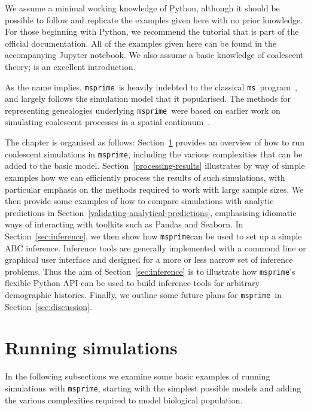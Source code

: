\documentclass[graybox]{svmult}
\newcommand{\msprime}[0]{\texttt{msprime}}
\newcommand{\ms}[0]{\texttt{ms}}
\begin{document}
We assume a minimal working knowledge of Python, although it should be 
possible to follow and replicate the examples given here with no prior
knowledge. For those beginning with Python, we recommend the  
tutorial that is part of the official documentation. All of the examples
given here can be found in the accompanying Jupyter notebook. We also assume a 
basic knowledge of coalescent theory; \cite{wakely2008coalescent} is an excellent
introduction.

As the name implies, \msprime\ is heavily indebted to the classical
\ms\ program~\citep{hudson2002generating}, and largely follows the
simulation model that it popularised. The methods for representing
genealogies underlying \msprime\ were based on earlier work on simulating coalescent
processes in a spatial
continuum~\citep{kelleher2013coalescent,kelleher2014coalescent}.

The chapter is organised as follows: Section~\ref{running-simulations} provides an overview of how to run coalescent simulations in \msprime, including the various
complexities that can be added to the basic model.
Section~\ref{processing-results} illustrates by way of simple examples how we can efficiently process the results
of such simulations, with particular emphasis on the methods
required to work with large sample sizes. We then provide
some examples of how to compare simulations with analytic
predictions in Section~\ref{validating-analytical-predictions},
emphasising idiomatic ways of interacting with toolkits such as
Pandas and Seaborn. In Section~\ref{sec:inference}, we then show 
how \msprime can be used to set up a simple ABC inference. 
Inference tools are generally implemented with a command line or graphical
user interface and designed for a more or less narrow set of inference
problems. Thus the aim of Section~\ref{sec:inference} is to illustrate how
\msprime's flexible Python API can be used to build inference tools for arbitrary demographic histories.
Finally, we outline some future plans for \msprime\ in Section~\ref{sec:discussion}.

\section{Running simulations}
\label{running-simulations}
In the following subsections we examine some basic examples of running 
simulations with \msprime, starting with the simplest possible models
and adding the various complexities required to model biological population.
\end{document}
